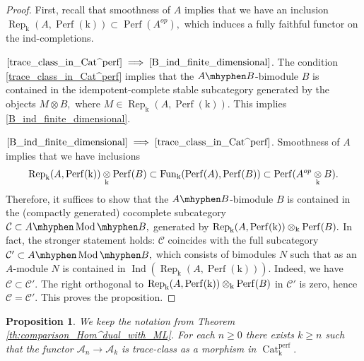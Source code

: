 \documentclass[11pt,leqno]{amsart}
\newcommand{\Implies}[2]{$\text{\ref{#1}}\implies\text{\ref{#2}}$}
\newtheorem{prop}[theo]{Proposition}
\numberwithin{equation}{section}
\newcommand{\tens}[1]{%
  \mathbin{\mathop{\otimes}\displaylimits_{#1}}%
}
\newcommand{\hy}{\mhyphen}
\newcommand{\Cat}{\operatorname{Cat}}
\newcommand{\mk}{\mathrm k}
\newcommand{\cA}{{\mathcal A}}
\newcommand{\cC}{{\mathcal C}}
\newcommand{\Fun}{\operatorname{Fun}}
\newcommand{\Perf}{\operatorname{Perf}}
\newcommand{\perf}{\operatorname{perf}}
\newcommand{\Rep}{\operatorname{Rep}}
\newcommand{\Ind}{\operatorname{Ind}}
\newcommand{\Mod}{\operatorname{Mod}}
\begin{document}
\begin{proof}
First, recall that smoothness of $A$ implies that we have an inclusion $\Rep_{\mk}(A,\Perf(\mk))\subset\Perf(A^{op}),$ which induces a fully faithful functor on the ind-completions.

\Implies{trace_class_in_Cat^perf}{B_ind_finite_dimensional}. The condition \ref{trace_class_in_Cat^perf} implies that the $A\hy B$-bimodule $B$ is contained in the idempotent-complete stable subcategory generated by the objects $M\otimes B,$ where $M\in \Rep_{\mk}(A,\Perf(\mk)).$ This implies \ref{B_ind_finite_dimensional}.

\Implies{B_ind_finite_dimensional}{trace_class_in_Cat^perf}. Smoothness of $A$ implies that we have inclusions 
\begin{equation*}
\Rep_{\mk}(A,\Perf(\mk))\tens{\mk} \Perf(B)\subset \Fun_{\mk}(\Perf(A),\Perf(B))\subset \Perf(A^{op}\tens{\mk}B).
\end{equation*}
Therefore, it suffices to show that the $A\hy B$-bimodule $B$ is contained in the (compactly generated) cocomplete subcategory $\cC\subset A\hy\Mod\hy B,$ generated by $\Rep_{\mk}(A,\Perf(\mk))\tens{\mk} \Perf(B).$ In fact, the stronger statement holds: $\cC$ coincides with the full subcategory $\cC'\subset A\hy\Mod\hy B,$
 which consists of bimodules $N$ such that as an $A$-module $N$ is contained in $\Ind(\Rep_{\mk}(A,\Perf(\mk))).$ Indeed, we have $\cC\subset\cC'.$ The right orthogonal to $\Rep_{\mk}(A,\Perf(\mk))\tens{\mk} \Perf(B)$ in $\cC'$ is zero, hence $\cC=\cC'.$ This proves the proposition.	 
\end{proof}

\begin{prop}\label{prop:trace_class_functors_for_fp_approx}
We keep the notation from Theorem \ref{th:comparison_Hom^dual_with_ML}. For each $n\geq 0$ there exists $k\geq n$ such that the functor $\cA_n\to\cA_k$ is trace-class as a morphism in $\Cat_{\mk}^{\perf}.$
\end{prop}
\end{document}
